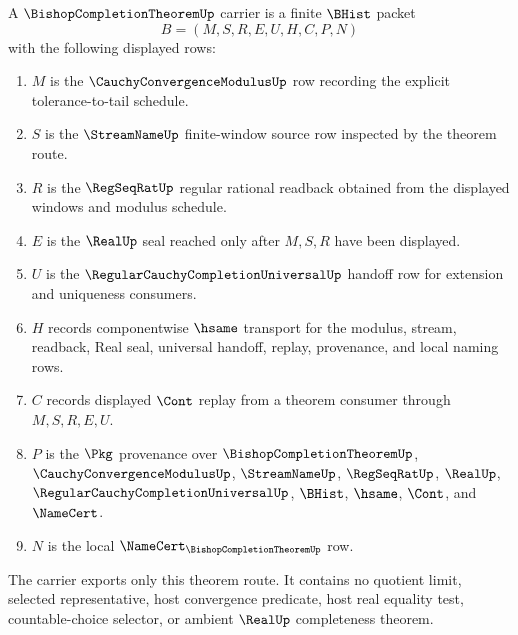 \begin{definition}
\label{def:bishop-completion-theorem-carrier}
A $\BishopCompletionTheoremUp$ carrier is a finite $\BHist$ packet
$$
B=(M,S,R,E,U,H,C,P,N)
$$
with the following displayed rows:
\begin{enumerate}
\item $M$ is the $\CauchyConvergenceModulusUp$ row recording the explicit tolerance-to-tail schedule.
\item $S$ is the $\StreamNameUp$ finite-window source row inspected by the theorem route.
\item $R$ is the $\RegSeqRatUp$ regular rational readback obtained from the displayed windows and modulus schedule.
\item $E$ is the $\RealUp$ seal reached only after $M,S,R$ have been displayed.
\item $U$ is the $\RegularCauchyCompletionUniversalUp$ handoff row for extension and uniqueness consumers.
\item $H$ records componentwise $\hsame$ transport for the modulus, stream, readback, Real seal, universal handoff, replay, provenance, and local naming rows.
\item $C$ records displayed $\Cont$ replay from a theorem consumer through $M,S,R,E,U$.
\item $P$ is the $\Pkg$ provenance over $\BishopCompletionTheoremUp$, $\CauchyConvergenceModulusUp$, $\StreamNameUp$, $\RegSeqRatUp$, $\RealUp$, $\RegularCauchyCompletionUniversalUp$, $\BHist$, $\hsame$, $\Cont$, and $\NameCert$.
\item $N$ is the local $\NameCert_{\BishopCompletionTheoremUp}$ row.
\end{enumerate}
The carrier exports only this theorem route. It contains no quotient limit, selected representative, host convergence predicate, host real equality test, countable-choice selector, or ambient $\RealUp$ completeness theorem.
\end{definition}

